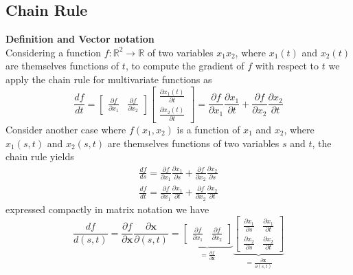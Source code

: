 \documentclass{report}
\begin{document}
\subsection{Chain Rule}%
\textbf{Definition and Vector notation}\\
Considering a function $f:\mathbb{R}^2\to\mathbb{R}$ of two variables $x_1x_2$, where $x_1(t)$ and $x_2(t)$ are
themselves functions of $t$, to compute the gradient of $f$ with respect to $t$ we apply the chain rule
for multivariate functions as
\begin{equation*}
\frac{df}{dt}=\begin{bmatrix}
\frac{\partial f}{\partial x_1}&\frac{\partial f}{\partial x_2}\end{bmatrix}
\begin{bmatrix}\frac{\partial x_1(t)}{\partial t}\\\frac{\partial x_2(t)}{\partial t}\end{bmatrix}
=\frac{\partial f}{\partial x_1}\frac{\partial x_1}{\partial t}+
\frac{\partial f}{\partial x_2}\frac{\partial x_2}{\partial t}
\end{equation*}
Consider another case where $f(x_1,x_2)$ is a function of $x_1$ and $x_2$, where $x_1(s,t)$ and $x_2(s,t)$ are
themselves functions of two variables $s$ and $t$, the chain rule yields
\begin{align*}
\frac{df}{ds}=\frac{\partial f}{\partial x_1}\frac{\partial x_1}{\partial s}+
\frac{\partial f}{\partial x_2}\frac{\partial x_2}{\partial s}\\
\frac{df}{dt}=\frac{\partial f}{\partial x_1}\frac{\partial x_1}{\partial t}+
\frac{\partial f}{\partial x_2}\frac{\partial x_2}{\partial t}
\end{align*}
expressed compactly in matrix notation we have
\begin{equation*}
\frac{df}{d(s,t)}=\frac{\partial f}{\partial\bm{x}}\frac{\partial\bm{x}}{\partial(s,t)}
=\underbrace{\begin{bmatrix}\frac{\partial f}{\partial x_1}&\frac{\partial f}{\partial x_2}\end{bmatrix}}_{=\frac{\partial f}{\partial\bm{x}}}
\underbrace{\begin{bmatrix}\frac{\partial x_1}{\partial s}&\frac{\partial x_1}{\partial t}\\
\frac{\partial x_2}{\partial s}&\frac{\partial x_2}{\partial t}
\end{bmatrix}}_{=\frac{\partial\bm{x}}{\partial(s,t)}}
\end{equation*}
\newpage
\end{document}
